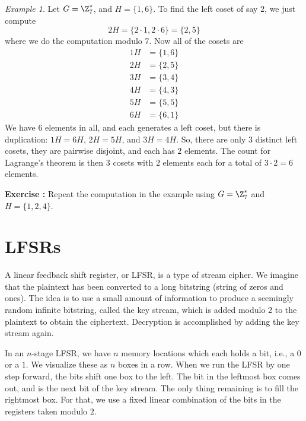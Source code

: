 \documentclass[12pt]{amsart}
\newcommand{\terminology}[1]{\textbf{\textit{#1}}}
\renewcommand{\terminology}[1]{#1}
\newcommand{\term}{\terminology}
\newcounter{probs}
\newenvironment{prob}{%
  \refstepcounter{probs}
  \par\medskip\noindent\textbf{Exercise \theprobs:} }{\par\medskip}
\theoremstyle{plain}
\theoremstyle{definition}
\theoremstyle{remark}
\newtheorem*{exam}{Example}
\begin{document}
\begin{exam}
  Let $G=\Z_7^*$, and $H=\{1,6\}$.  To find the left coset of say $2$,
  we just compute
  \[ 2H = \{2\cdot 1, 2\cdot 6\} = \{2, 5\}\]
  where we do the computation modulo $7$.  Now all of the cosets are
  \begin{align*}
    1H &= \{1, 6\} \\
    2H &= \{2, 5\} \\
    3H &= \{3, 4\} \\
    4H &= \{4, 3\} \\
    5H &= \{5, 5\} \\
    6H &= \{6, 1\} 
  \end{align*}
  We have $6$ elements in all, and each generates a left coset, but
  there is duplication: $1H=6H$, $2H=5H$, and $3H=4H$.  So, there are
  only $3$ distinct left cosets, they are pairwise disjoint, and each
  has $2$ elements.  The count for Lagrange's theorem is then $3$
  cosets with $2$ elements each for a total of $3\cdot 2=6$ elements.
\end{exam}
\begin{prob}
  Repeat the computation in the example using $G=\Z_7^*$ and
  $H=\{1,2,4\}$.
\end{prob}


\section{LFSRs} \label{lfsr}
A \term{linear feedback shift register}, or LFSR, is a type of stream
cipher.  We imagine that the plaintext has been converted to a long
bitstring (string of zeros and ones).  The idea is to use a small
amount of information to produce a seemingly random infinite
bitstring, called the key stream, which is added modulo $2$ to the
plaintext to obtain the ciphertext.  Decryption is accomplished by
adding the key stream again.

In an $n$-stage LFSR, we have $n$ memory locations which each holds a
bit, i.e., a $0$ or a $1$.  We visualize these as $n$ boxes in a row.
When we run the LFSR by one step forward, the bits shift one box to
the left.  The bit in the leftmost box comes out, and is the next bit
of the key stream.  The only thing remaining is to fill the rightmost
box.  For that, we use a fixed linear combination of the bits in the
registers taken modulo $2$.

\begin{comment}
Let $n$ be a positive integer.  An $n$-stage LFSR generates its key
stream by a linear recurrence relation
\[ x_{k+n} = c_{n-1} x_{k+n-1}\pots c_0 x_k\]
where $(c_0\cots c_{n-1})\in\Z_2^n$ is a fixed vector called the
taps.  Note that if $c_0=0$, then the recurrence relation has
effectively at most $n-1$ terms, so would be an $n-1$-stage LFSR.  So,
we assume $c_0=1$.
\end{comment}
\end{document}
